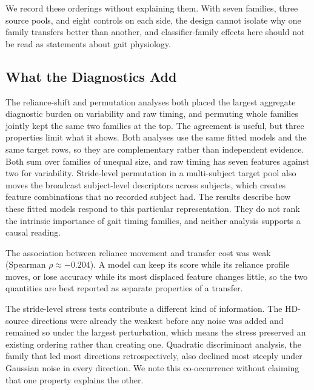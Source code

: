 \documentclass[conference]{IEEEtran}
\begin{document}
We record these orderings without explaining them. With seven families, three source pools, and eight controls on each side, the design cannot isolate why one family transfers better than another, and classifier-family effects here should not be read as statements about gait physiology.

\subsection{What the Diagnostics Add}
The reliance-shift and permutation analyses both placed the largest aggregate diagnostic burden on variability and raw timing, and permuting whole families jointly kept the same two families at the top. The agreement is useful, but three properties limit what it shows. Both analyses use the same fitted models and the same target rows, so they are complementary rather than independent evidence. Both sum over families of unequal size, and raw timing has seven features against two for variability. Stride-level permutation in a multi-subject target pool also moves the broadcast subject-level descriptors across subjects, which creates feature combinations that no recorded subject had. The results describe how these fitted models respond to this particular representation. They do not rank the intrinsic importance of gait timing families, and neither analysis supports a causal reading.

The association between reliance movement and transfer cost was weak (Spearman $\rho \approx -0.204$). A model can keep its score while its reliance profile moves, or lose accuracy while its most displaced feature changes little, so the two quantities are best reported as separate properties of a transfer.

The stride-level stress tests contribute a different kind of information. The HD-source directions were already the weakest before any noise was added and remained so under the largest perturbation, which means the stress preserved an existing ordering rather than creating one. Quadratic discriminant analysis, the family that led most directions retrospectively, also declined most steeply under Gaussian noise in every direction. We note this co-occurrence without claiming that one property explains the other.
\end{document}
